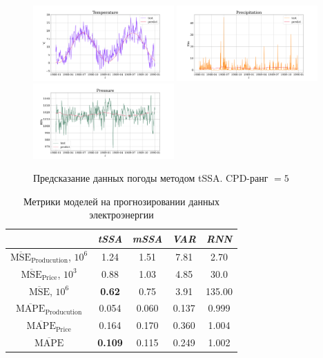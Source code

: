 			\begin{figure}[h]
				\centering
				\includegraphics[width=0.48\textwidth, keepaspectratio]{../experiments/weather/tssa/figs/prediction/cpd_rank_5/Temperature.png}
				\includegraphics[width=0.48\textwidth, keepaspectratio]{../experiments/weather/tssa/figs/prediction/cpd_rank_5/Precipitation.png}
				\includegraphics[width=0.48\textwidth, keepaspectratio]{../experiments/weather/tssa/figs/prediction/cpd_rank_5/Pressure.png}
				\caption{Предсказание данных погоды методом tSSA. CPD-ранг $ = 5 $}\label{fig:tssa_weather_pred}
			\end{figure}
			
			\def\arraystretch{1.1}
			\begin{table}[h]
				\centering
				\caption{Метрики моделей на прогнозировании данных электроэнергии}\label{tab:pred_res_electr}
				\begin{tabular}{|c|c|c|c|c|}
					\hline
					& \textit{tSSA}  & \textit{mSSA} & \textit{VAR} & \textit{RNN} \\ \hline
					$ \overline{\text{MSE}}_{\text{Producution}} $, $10^6$ & 1.24           & 1.51          & 7.81         & 2.70         \\ \hline
					$ \overline{\text{MSE}}_{\text{Price}} $, $10^3$      & 0.88           & 1.03          & 4.85         & 30.0         \\ \hline
					$ \overline{\text{MSE}} $, $10^6$             & \textbf{0.62}  & 0.75          & 3.91         & 135.00       \\ \hline
					$ \overline{\text{MAPE}}_{\text{Producution}} $        & 0.054          & 0.060         & 0.137        & 0.999        \\ \hline
					$ \overline{\text{MAPE}}_{\text{Price}} $             & 0.164          & 0.170         & 0.360        & 1.004        \\ \hline
					$ \overline{\text{MAPE}} $                    & \textbf{0.109} & 0.115         & 0.249        & 1.002        \\ \hline
				\end{tabular}
			\end{table}
			
